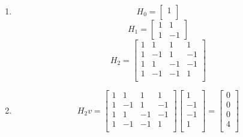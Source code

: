 \documentclass[11pt]{article}
\begin{document}
\renewcommand{\labelenumi}{(\alph{enumi})}
\begin{enumerate}
	\item 
	\[
		H_0=
		\begin{bmatrix} 
			1 \\
		\end{bmatrix}
	\]
	\[
		H_1=
		\begin{bmatrix} 
			1 & 1 \\ 
			1 & -1 
		\end{bmatrix}
	\]
		\[
		H_2=
		\begin{bmatrix} 
			1 & 1 & 1 & 1 \\ 
			1 & -1 & 1 & -1 \\ 
			1 & 1 & -1 & -1 \\
			1 & -1 & -1 & 1 \\
		\end{bmatrix}
	\]
	
	\item 
	\[
		H_2v = 
		\begin{bmatrix} 
			1 & 1 & 1 & 1 \\ 
			1 & -1 & 1 & -1 \\ 
			1 & 1 & -1 & -1 \\
			1 & -1 & -1 & 1 \\
		\end{bmatrix}
		\begin{bmatrix} 
			1  \\ 
			-1  \\ 
			-1  \\
			1  \\
		\end{bmatrix}
		=
		\begin{bmatrix} 
			0  \\ 
			0  \\ 
			0  \\
			4  \\
		\end{bmatrix}
	\]
	

\end{enumerate}
\end{document}
